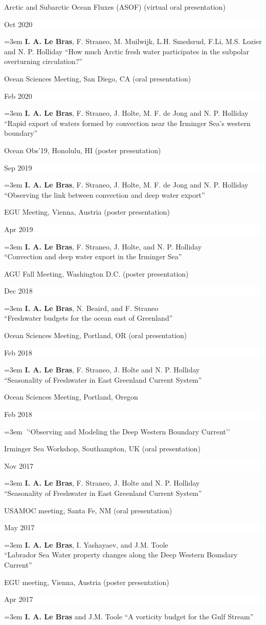 \documentclass[paper=letter,fontsize=11pt]{scrartcl} %
\newcommand{\sepspace}{\vspace*{3mm}}		%
\newcommand{\TalkEntry}[3]{
		\noindent #1 \hfill      %
		\colorbox{White}{%
			\parbox{6em}{%
			\hfill\color{Black}#2}} \par  %
		\noindent\hangindent=3em\hangafter=0 \textit ``#3''\sepspace} %
\newcommand{\ConfEntry}[5]{
		\noindent #1 (#2) \hfill      %
		\colorbox{White}{%
			\parbox{6em}{%
			\hfill\color{Black}#3}} \par %
		\noindent \hangindent=3em\hangafter=0 #4 ``#5'' \sepspace}
\begin{document}
\ConfEntry{Arctic and Subarctic Ocean Fluxes (ASOF)}{virtual oral presentation}{Oct 2020}{\textbf{I. A. Le Bras}, F. Straneo, M. Muilwijk, L.H. Smedsrud, F.Li, M.S. Lozier and N. P. Holliday}{How much Arctic fresh water participates in the subpolar overturning circulation?}

\ConfEntry{Ocean Sciences Meeting, San Diego, CA}{oral presentation}{Feb 2020}{\textbf{I. A. Le Bras}, F. Straneo, J. Holte, M. F. de Jong and N. P. Holliday\\}{Rapid export of waters formed by convection near the Irminger Sea's western boundary}


\ConfEntry{Ocean Obs'19, Honolulu, HI}{poster presentation}{Sep 2019}{\textbf{I. A. Le Bras}, F. Straneo, J. Holte, M. F. de Jong and N. P. Holliday\\}{Observing the link between convection and deep water export}

\ConfEntry{EGU Meeting, Vienna, Austria}{poster presentation}{Apr 2019}{\textbf{I. A. Le Bras}, F. Straneo, J. Holte, and N. P. Holliday\\}{Convection and deep water export in the Irminger Sea}

\ConfEntry{AGU Fall Meeting, Washington D.C.}{poster presentation}{Dec 2018}{\textbf{I. A. Le Bras}, N. Beaird, and F. Straneo\\}{Freshwater budgets for the ocean east of Greenland}

\ConfEntry{Ocean Sciences Meeting, Portland, OR}{oral presentation}{Feb 2018}{\textbf{I. A. Le Bras}, F. Straneo, J. Holte and N. P. Holliday\\}{Seasonality of Freshwater in East Greenland Current System}

\TalkEntry{Ocean Sciences Meeting, Portland, Oregon}{Feb 2018}{Observing and Modeling the Deep Western Boundary Current}

\ConfEntry{Irminger Sea Workshop, Southampton, UK}{oral presentation}{Nov 2017}{\textbf{I. A. Le Bras}, F. Straneo, J. Holte and N. P. Holliday\\}{Seasonality of Freshwater in East Greenland Current System}

\ConfEntry{USAMOC meeting, Santa Fe, NM}{oral presentation}{May 2017}{\textbf{I. A. Le Bras}, I. Yashayaev, and J.M. Toole\\}{Labrador Sea Water property changes along the Deep Western Boundary Current}

\ConfEntry{EGU meeting, Vienna, Austria}{poster presentation}{Apr 2017}{\textbf{I. A. Le Bras} and J.M. Toole}{A vorticity budget for the Gulf Stream}
\end{document}
